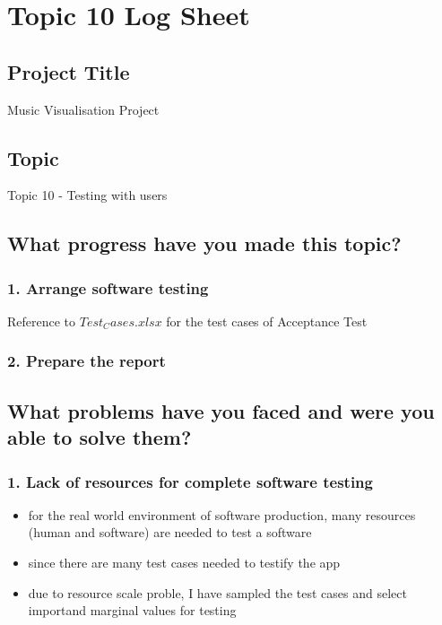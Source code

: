 \chapter*{Topic 10 Log Sheet}

\section*{Project Title}

Music Visualisation Project

\section*{Topic}

Topic 10 - Testing with users

\section*{What progress have you made this topic?}

\subsection*{1. Arrange software testing}

Reference to $Test_Cases.xlsx$ for the test cases of Acceptance Test

\subsection*{2. Prepare the report}

\section*{What problems have you faced and were you able to solve them?}

\subsection*{1. Lack of resources for complete software testing}

\begin{itemize}
  \item for the real world environment of software production, many resources (human and software) are needed to test a software
  \item since there are many test cases needed to testify the app
  \item due to resource scale proble, I have sampled the test cases and select importand marginal values for testing
\end{itemize}

